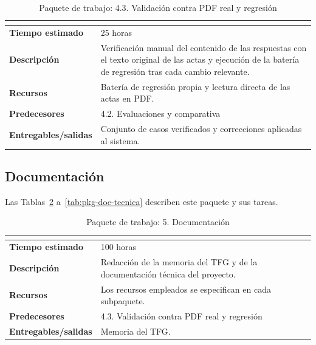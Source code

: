 \documentclass[11pt, a4paper]{report}
\begin{document}
	\begin{table}[H]
		\centering
		\begin{tabularx}{\linewidth}{|>{\bfseries}l|X|}
			\hline
			\rowcolor{pkg-evaluacion}
			\multicolumn{2}{|c|}{\textcolor{white}{\textbf{4.3. Validación contra PDF real y regresión}}} \\
			\hline
			Tiempo estimado & 25 horas \\
			\hline
			\rowcolor{fila-alterna}
			Descripción & Verificación manual del contenido de las respuestas con el texto original de las actas y ejecución de la batería de regresión tras cada cambio relevante. \\
			\hline
			Recursos & Batería de regresión propia y lectura directa de las actas en PDF. \\
			\hline
			\rowcolor{fila-alterna}
			Predecesores & 4.2. Evaluaciones y comparativa \\
			\hline
			Entregables/salidas & Conjunto de casos verificados y correcciones aplicadas al sistema. \\
			\hline
		\end{tabularx}
		\caption{Paquete de trabajo: 4.3. Validación contra PDF real y regresión}
		\label{tab:pkg-validacion}
	\end{table}

	\subsection{Documentación}

	Las Tablas~\ref{tab:pkg-documentacion} a~\ref{tab:pkg-doc-tecnica} describen este paquete y sus tareas.

	\begin{table}[H]
		\centering
		\begin{tabularx}{\linewidth}{|>{\bfseries}l|X|}
			\hline
			\rowcolor{pkg-documentacion}
			\multicolumn{2}{|c|}{\textcolor{white}{\textbf{5. Documentación}}} \\
			\hline
			Tiempo estimado & 100 horas \\
			\hline
			\rowcolor{fila-alterna}
			Descripción & Redacción de la memoria del TFG y de la documentación
			técnica del proyecto. \\
			\hline
			Recursos & Los recursos empleados se especifican en cada subpaquete. \\
			\hline
			\rowcolor{fila-alterna}
			Predecesores & 4.3. Validación contra PDF real y regresión \\
			\hline
			Entregables/salidas & Memoria del TFG. \\
			\hline
		\end{tabularx}
		\caption{Paquete de trabajo: 5. Documentación}
		\label{tab:pkg-documentacion}
	\end{table}
\end{document}
